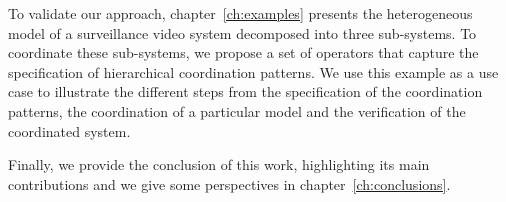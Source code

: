 To validate our approach, chapter~\ref{ch:examples} presents the heterogeneous model of a surveillance video system decomposed into three sub-systems. To coordinate these sub-systems, we propose a set of \bcool operators that capture the specification of hierarchical coordination patterns. We use this example as a use case to illustrate the different steps from the specification of the coordination patterns, the coordination of a particular model and the verification of the coordinated system.     

Finally, we provide the conclusion of this work, highlighting its main contributions and we give some perspectives in chapter~\ref{ch:conclusions}.

	
	







